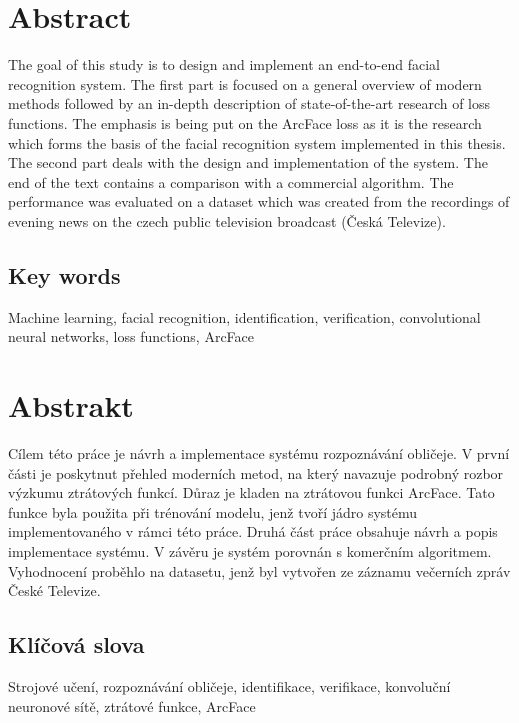 \section*{Abstract}
The goal of this study is to design and implement an end-to-end facial recognition system.
The first part is focused on a general overview of modern methods followed by an in-depth description of
state-of-the-art research of loss functions.
The emphasis is being put on the ArcFace loss as it is the research which forms the basis of the facial recognition
system implemented in this thesis.
The second part deals with the design and implementation of the system.
The end of the text contains a comparison with a commercial algorithm.
The performance was evaluated on a dataset which was created from the recordings of evening news on the czech public
television broadcast (Česká Televize).

\vspace{1cm}

\subsection*{Key words}
Machine learning, facial recognition, identification, verification, convolutional neural networks, loss functions,
ArcFace

\vfill

\section*{Abstrakt}
Cílem této práce je návrh a implementace systému rozpoznávání obličeje.
V první části je poskytnut přehled moderních metod, na který navazuje podrobný rozbor výzkumu ztrátových funkcí.
Důraz je kladen na ztrátovou funkci ArcFace.
Tato funkce byla použita při trénování modelu, jenž tvoří jádro systému implementovaného v rámci této práce.
Druhá část práce obsahuje návrh a popis implementace systému.
V závěru je systém porovnán s komerčním algoritmem.
Vyhodnocení proběhlo na datasetu, jenž byl vytvořen ze záznamu večerních zpráv České Televize.

\vspace{1cm}

\subsection*{Klíčová slova}
Strojové učení, rozpoznávání obličeje, identifikace, verifikace, konvoluční neuronové sítě, ztrátové funkce, ArcFace